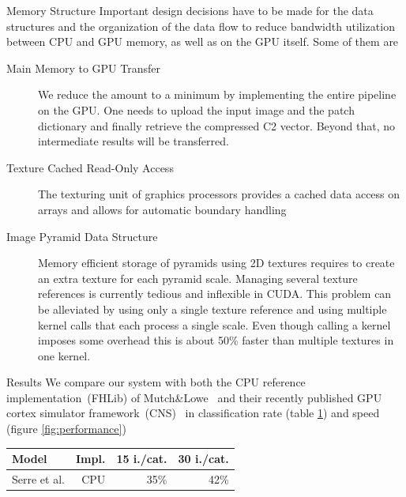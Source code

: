 \documentclass[final]{beamer}
\begin{document}
\begin{frame}{}
\begin{columns}[t]
      \begin{column}{.48\linewidth}
        \begin{block}{Memory Structure}
          Important design decisions have to be made for the data structures and
the organization of the data flow to reduce bandwidth utilization
between CPU and GPU memory, as well as on the GPU itself. Some of them are
\begin{description}
\item[ Main Memory to GPU Transfer ] 
We reduce the amount to a minimum by
implementing the entire pipeline on the GPU. One needs to upload the input image and the patch
dictionary  and finally retrieve the compressed C2
vector. Beyond that, no intermediate results will be transferred.  
\item[ Texture Cached Read-Only Access]
The texturing unit of graphics processors provides a cached data access
on arrays and allows for automatic boundary handling
\item [ Image Pyramid Data Structure]
Memory efficient storage of pyramids using 2D textures requires to
create an extra texture for each pyramid scale. Managing several
texture references is currently tedious and inflexible in CUDA.  This
problem can be alleviated by using only a single texture reference and
using multiple kernel calls that each process a single scale.  Even
though calling a kernel imposes some overhead this is about 50\%
faster than multiple textures in one kernel.\newline
\end{description}
        \end{block}



        \begin{block}{Results}
We compare our system with both the CPU reference implementation~(FHLib) of Mutch\&Lowe~\cite{mutch06} and their
recently published GPU cortex simulator framework~(CNS)~\cite{mutch10} in classification rate (table \ref{table:caltech}) and speed (figure \ref{fig:performance})
\newline
\begin{table}[t]
  \begin{center}

    \label{table:caltech}
    \begin{tabular}{|l|r|r|r|}
     \hline
      Model & Impl. & 15 i./cat. & 30 i./cat.\\
      \hline
      Serre et al. \cite{serre05}                          & CPU & 35\% & 42\% \\ %
		 

\end{tabular}
\end{center}
\end{table}
\end{block}
\end{column}
\end{columns}
\end{frame}
\end{document}
